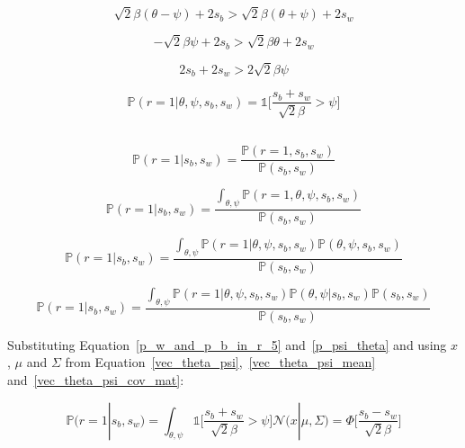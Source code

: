 \documentclass[a4paper,11pt]{article}
\theoremstyle{mytheor}
\begin{document}
\begin{equation}
    \label{p_w_and_p_b_in_r_2}
    \sqrt{2}\beta(\theta-\psi) + 2s_b > \sqrt{2}\beta(\theta+\psi) + 2s_w
\end{equation}

\begin{equation}
    \label{p_w_and_p_b_in_r_3}
    -\sqrt{2}\beta\psi + 2s_b > \sqrt{2}\beta\theta + 2s_w
\end{equation}

\begin{equation}
    \label{p_w_and_p_b_in_r_4}
    2s_b + 2s_w > 2\sqrt{2}\beta\psi
\end{equation}

\begin{equation}
    \label{p_w_and_p_b_in_r_5}
    \mathbb{P}(r=1|\theta,\psi,s_b,s_w)=\mathbb{1}\Bigg[\frac{s_b + s_w}{\sqrt{2}\beta} > \psi\Bigg]
\end{equation}

\subsection{}

\begin{equation}
    \mathbb{P}(r=1|s_b,s_w) = \frac{\mathbb{P}(r=1,s_b,s_w)}{\mathbb{P}(s_b,s_w)}
\end{equation}

\begin{equation}
    \mathbb{P}(r=1|s_b,s_w) = \frac{\int_{\theta,\psi} \mathbb{P}(r=1,\theta,\psi,s_b,s_w)}{\mathbb{P}(s_b,s_w)}
\end{equation}

\begin{equation}
    \mathbb{P}(r=1|s_b,s_w) = \frac{\int_{\theta,\psi} \mathbb{P}(r=1|\theta,\psi,s_b,s_w)\mathbb{P}(\theta,\psi,s_b,s_w)}{\mathbb{P}(s_b,s_w)}
\end{equation}

\begin{equation}
    \mathbb{P}(r=1|s_b,s_w) = \frac{\int_{\theta,\psi} \mathbb{P}(r=1|\theta,\psi,s_b,s_w)\mathbb{P}(\theta,\psi|s_b,s_w)\mathbb{P}(s_b,s_w)}{\mathbb{P}(s_b,s_w)}
\end{equation}

Substituting Equation~\ref{p_w_and_p_b_in_r_5} and~\ref{p_psi_theta} and using $x$, $\mu$ and $\Sigma$ from Equation~\ref{vec_theta_psi},~\ref{vec_theta_psi_mean} and~\ref{vec_theta_psi_cov_mat}:

\begin{equation}
    \mathbb{P}(r=1|s_b,s_w) = \int_{\theta,\psi} \mathbb{1}\Bigg[\frac{s_b+s_w}{\sqrt{2}\beta}>\psi\Bigg]
    \mathcal{N}\Big( x|\mu,\Sigma \Big) = \Phi\Bigg[ \frac{s_b-s_w}{\sqrt{2}\beta} \Bigg]
\end{equation}

\subsection{}

\section{}
\end{document}
